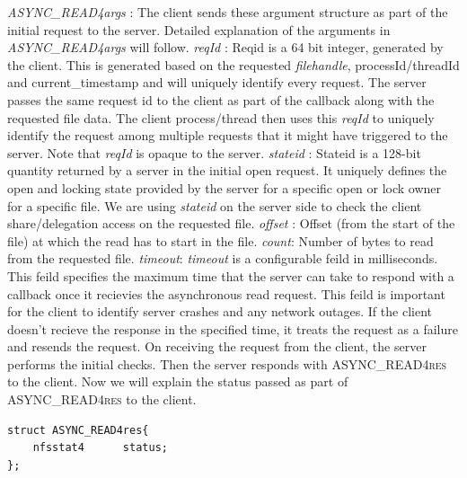 \noindent\textit{ASYNC\_READ4args} : The client sends these argument structure as part of the initial request to the server. Detailed explanation of the arguments in \textit{ASYNC\_READ4args} will follow. 
\hfill \break \newline
\noindent\textit{reqId} : Reqid is a 64 bit integer, generated by the client. This is generated based on the requested \textit{filehandle}, processId/threadId and current\_timestamp and will uniquely identify every request. The server passes the same request id to the client as part of the callback along with the requested file data. The client process/thread then uses this  \textit{reqId} to uniquely identify the request among multiple requests that it might have triggered to the server. Note that \textit{reqId} is opaque to the server.
\hfill \break \newline
\noindent\textit{stateid} : Stateid is a 128-bit quantity returned by a server in the initial open request. It uniquely defines the open and locking state provided by the server for a specific open or lock owner for a specific file. We are using \textit{stateid} on the server side to check the client share/delegation access on the requested file. 
\hfill \break \newline
\noindent\textit{offset} : Offset (from the start of the file) at which the read has to start in the file. 
\hfill \break \newline
\noindent\textit{count}: Number of bytes to read from the requested file.
\hfill \break \newline
\noindent\textit{timeout}: \textit{timeout} is a configurable feild in milliseconds. This feild specifies the maximum time that the server can take to respond with a callback once it recievies the asynchronous read request. This feild is important for the client to identify server crashes and any network outages. If the client doesn't recieve the response in the specified time, it treats the request as a failure and resends the request.     
\hfill \break \newline
\noindent On receiving the request from the client, the server performs the initial checks. Then the server responds with \textsc{ASYNC\_READ4res} to the client. Now we will explain the status passed as part of \textsc{ASYNC\_READ4res} to the client.  

\begin{lstlisting}
struct ASYNC_READ4res{
	nfsstat4	  status;
};
\end{lstlisting}

